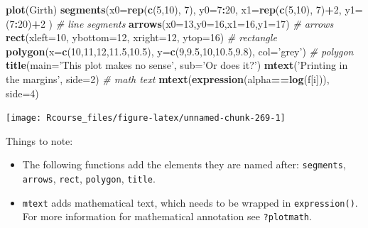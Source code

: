 \documentclass[]{book}
\newenvironment{Shaded}{\begin{snugshade}}{\end{snugshade}}
\newcommand{\CommentTok}[1]{\textcolor[rgb]{0.56,0.35,0.01}{\textit{#1}}}
\newcommand{\DataTypeTok}[1]{\textcolor[rgb]{0.13,0.29,0.53}{#1}}
\newcommand{\DecValTok}[1]{\textcolor[rgb]{0.00,0.00,0.81}{#1}}
\newcommand{\FloatTok}[1]{\textcolor[rgb]{0.00,0.00,0.81}{#1}}
\newcommand{\KeywordTok}[1]{\textcolor[rgb]{0.13,0.29,0.53}{\textbf{#1}}}
\newcommand{\NormalTok}[1]{#1}
\newcommand{\OperatorTok}[1]{\textcolor[rgb]{0.81,0.36,0.00}{\textbf{#1}}}
\newcommand{\StringTok}[1]{\textcolor[rgb]{0.31,0.60,0.02}{#1}}
\providecommand{\tightlist}{%
  \setlength{\itemsep}{0pt}\setlength{\parskip}{0pt}}
\theoremstyle{definition}
\theoremstyle{definition}
\theoremstyle{definition}
\theoremstyle{remark}
\begin{document}
\begin{Shaded}
\begin{Highlighting}[]
\KeywordTok{plot}\NormalTok{(Girth)}
\KeywordTok{segments}\NormalTok{(}\DataTypeTok{x0=}\KeywordTok{rep}\NormalTok{(}\KeywordTok{c}\NormalTok{(}\DecValTok{5}\NormalTok{,}\DecValTok{10}\NormalTok{), }\DecValTok{7}\NormalTok{), }\DataTypeTok{y0=}\DecValTok{7}\OperatorTok{:}\DecValTok{20}\NormalTok{, }\DataTypeTok{x1=}\KeywordTok{rep}\NormalTok{(}\KeywordTok{c}\NormalTok{(}\DecValTok{5}\NormalTok{,}\DecValTok{10}\NormalTok{), }\DecValTok{7}\NormalTok{)}\OperatorTok{+}\DecValTok{2}\NormalTok{, }\DataTypeTok{y1=}\NormalTok{(}\DecValTok{7}\OperatorTok{:}\DecValTok{20}\NormalTok{)}\OperatorTok{+}\DecValTok{2}\NormalTok{ ) }\CommentTok{# line segments}
\KeywordTok{arrows}\NormalTok{(}\DataTypeTok{x0=}\DecValTok{13}\NormalTok{,}\DataTypeTok{y0=}\DecValTok{16}\NormalTok{,}\DataTypeTok{x1=}\DecValTok{16}\NormalTok{,}\DataTypeTok{y1=}\DecValTok{17}\NormalTok{) }\CommentTok{# arrows}
\KeywordTok{rect}\NormalTok{(}\DataTypeTok{xleft=}\DecValTok{10}\NormalTok{, }\DataTypeTok{ybottom=}\DecValTok{12}\NormalTok{,  }\DataTypeTok{xright=}\DecValTok{12}\NormalTok{, }\DataTypeTok{ytop=}\DecValTok{16}\NormalTok{) }\CommentTok{# rectangle}
\KeywordTok{polygon}\NormalTok{(}\DataTypeTok{x=}\KeywordTok{c}\NormalTok{(}\DecValTok{10}\NormalTok{,}\DecValTok{11}\NormalTok{,}\DecValTok{12}\NormalTok{,}\FloatTok{11.5}\NormalTok{,}\FloatTok{10.5}\NormalTok{), }\DataTypeTok{y=}\KeywordTok{c}\NormalTok{(}\DecValTok{9}\NormalTok{,}\FloatTok{9.5}\NormalTok{,}\DecValTok{10}\NormalTok{,}\FloatTok{10.5}\NormalTok{,}\FloatTok{9.8}\NormalTok{), }\DataTypeTok{col=}\StringTok{'grey'}\NormalTok{) }\CommentTok{# polygon}
\KeywordTok{title}\NormalTok{(}\DataTypeTok{main=}\StringTok{'This plot makes no sense'}\NormalTok{, }\DataTypeTok{sub=}\StringTok{'Or does it?'}\NormalTok{) }
\KeywordTok{mtext}\NormalTok{(}\StringTok{'Printing in the margins'}\NormalTok{, }\DataTypeTok{side=}\DecValTok{2}\NormalTok{) }\CommentTok{# math text}
\KeywordTok{mtext}\NormalTok{(}\KeywordTok{expression}\NormalTok{(alpha}\OperatorTok{==}\KeywordTok{log}\NormalTok{(f[i])), }\DataTypeTok{side=}\DecValTok{4}\NormalTok{)}
\end{Highlighting}
\end{Shaded}

\texttt{[image: Rcourse\_files/figure-latex/unnamed-chunk-269-1]}

Things to note:

\begin{itemize}
\tightlist
\item
  The following functions add the elements they are named after: \texttt{segments}, \texttt{arrows}, \texttt{rect}, \texttt{polygon}, \texttt{title}.
\item
  \texttt{mtext} adds mathematical text, which needs to be wrapped in \texttt{expression()}. For more information for mathematical annotation see \texttt{?plotmath}.
\end{itemize}
\end{document}
